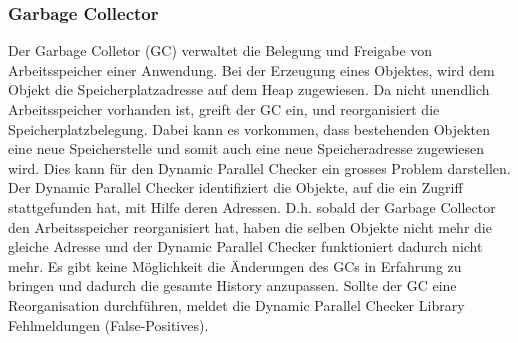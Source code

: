 \documentclass[10pt,a4paper]{article}
\begin{document}
\subsubsection{Garbage Collector}
Der Garbage Colletor (GC) verwaltet die Belegung und Freigabe von Arbeitsspeicher einer Anwendung. Bei der Erzeugung eines Objektes, wird dem Objekt die Speicherplatzadresse auf dem Heap zugewiesen. Da nicht unendlich Arbeitsspeicher vorhanden ist, greift der GC ein, und reorganisiert die Speicherplatzbelegung. Dabei kann es vorkommen, dass bestehenden Objekten eine neue Speicherstelle und somit auch eine neue Speicheradresse zugewiesen wird. Dies kann für den Dynamic Parallel Checker ein grosses Problem darstellen.\\
Der Dynamic Parallel Checker identifiziert die Objekte, auf die ein Zugriff stattgefunden hat, mit Hilfe deren Adressen. D.h. sobald der Garbage Collector den Arbeitsspeicher reorganisiert hat, haben die selben Objekte nicht mehr die gleiche Adresse und der Dynamic Parallel Checker funktioniert dadurch nicht mehr. Es gibt keine Möglichkeit die Änderungen des GCs in Erfahrung zu bringen und dadurch die gesamte History anzupassen. Sollte der GC eine Reorganisation durchführen, meldet die Dynamic Parallel Checker Library Fehlmeldungen (False-Positives).
\end{document}
